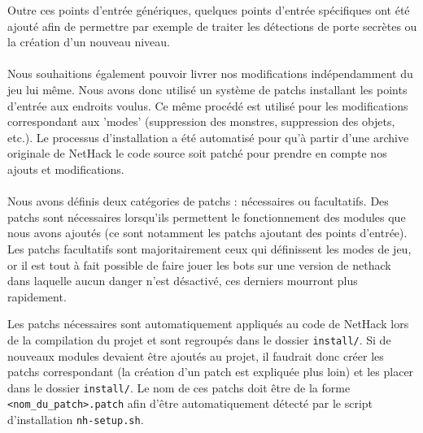 \documentclass[a4paper,12pt]{article}
\begin{document}
Outre ces points d'entrée génériques, quelques points d'entrée spécifiques
ont été ajouté afin de permettre par exemple de traiter les détections de
porte secrètes ou la création d'un nouveau niveau.

\paragraph{} Nous souhaitions également pouvoir livrer nos modifications
indépendamment du jeu lui même. Nous avons donc utilisé un système de patchs
installant les points d'entrée aux endroits voulus. Ce même procédé est
utilisé pour les modifications correspondant aux 'modes' (suppression des
monstres, suppression des objets, etc.). Le processus d'installation a été
automatisé pour qu'à partir d'une archive originale de NetHack le code source
soit patché pour prendre en compte nos ajouts et modifications.

\paragraph{} 
Nous avons définis deux catégories de patchs : nécessaires ou facultatifs.
Des patchs sont nécessaires lorsqu'ils permettent le fonctionnement des
modules que nous avons ajoutés (ce sont notamment les patchs ajoutant des
points d'entrée). Les patchs facultatifs sont majoritairement ceux qui
définissent les modes de jeu, or il est tout à fait possible de faire jouer les
bots sur une version de nethack dans laquelle aucun danger n'est désactivé,
ces derniers mourront plus rapidement.

Les patchs nécessaires sont automatiquement appliqués au code de NetHack lors
de la compilation du projet et sont regroupés dans le dossier \verb!install/!.
Si de nouveaux modules devaient être ajoutés au projet, il faudrait donc créer
les patchs correspondant (la création d'un patch est expliquée plus loin) et
les placer dans le dossier \verb!install/!. Le nom de ces patchs doit être de
la forme \verb!<nom_du_patch>.patch! afin d'être automatiquement détecté par
le script d'installation \verb!nh-setup.sh!. 

% 
\end{document}
